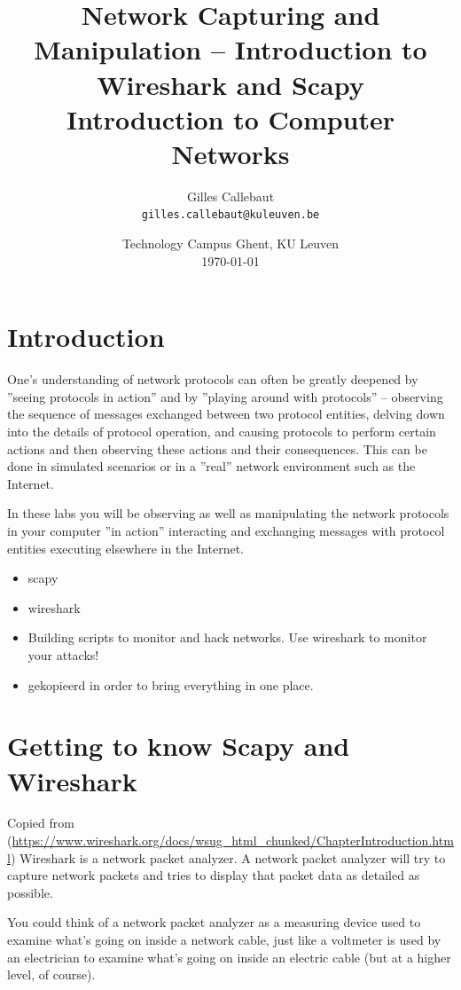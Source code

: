 \documentclass[11pt,a4paper]{article}
\title{Network Capturing and Manipulation -- Introduction to Wireshark and Scapy\\{\Large Introduction to Computer Networks}}
\author{Gilles Callebaut\\ \texttt{gilles.callebaut@kuleuven.be}}
\date{Technology Campus Ghent, KU Leuven\\ \today}
\begin{document}
 \sloppy

\maketitle

\newpage

\tableofcontents

\section{Introduction}
One's understanding of network protocols can often be greatly deepened by ''seeing
protocols in action'' and by ''playing around with protocols'' – observing the sequence of messages exchanged between two protocol entities, delving down into the details of protocol operation, and causing protocols to perform certain actions and then observing these actions and their consequences. This can be done in simulated scenarios or in a ''real'' network environment such as the Internet. 

In these labs you will be observing as well as manipulating the network protocols
in your computer ''in action'' interacting and exchanging messages with protocol entities executing elsewhere in the Internet. 

\begin{itemize}
    \item scapy
    \item wireshark
    \item Building scripts to monitor and hack networks. Use wireshark to monitor your attacks!
    \item gekopieerd in order to bring everything in one place.
\end{itemize}

\section{Getting to know Scapy and Wireshark}
Copied from (\url{https://www.wireshark.org/docs/wsug_html_chunked/ChapterIntroduction.html})
Wireshark is a network packet analyzer. A network packet analyzer will try to capture network packets and tries to display that packet data as detailed as possible.

You could think of a network packet analyzer as a measuring device used to examine what's going on inside a network cable, just like a voltmeter is used by an electrician to examine what's going on inside an electric cable (but at a higher level, of course).
\end{document}
